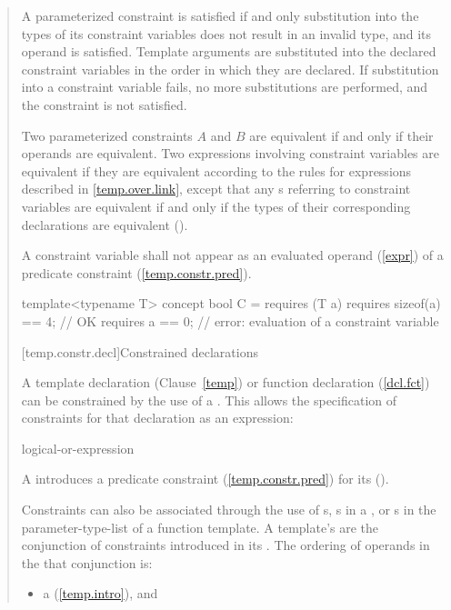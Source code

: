 \begin{quote}
\pnum
A parameterized constraint is satisfied if and only substitution into 
the types of its constraint variables does not result in an invalid type, and its
operand is satisfied. Template arguments are substituted into the declared
constraint variables in the order in which they are declared. If substitution 
into a constraint variable fails, no more substitutions are performed, and
the constraint is not satisfied.

\pnum
Two parameterized constraints $A$ and $B$ are equivalent 
if and only if their operands are equivalent.
% 
Two expressions involving constraint variables are equivalent if they
are equivalent according to the rules for expressions described in 
\ref{temp.over.link}, except that any s referring to 
constraint variables are equivalent if and only if the types of their 
corresponding declarations are equivalent ().

\pnum
A constraint variable shall not appear as an evaluated operand 
(\ref{expr}) of a predicate constraint (\ref{temp.constr.pred}).
\enterexample
\begin{codeblock}
template<typename T> 
  concept bool C = requires (T a) {
    requires sizeof(a) == 4; // OK
    requires a == 0;         // error: evaluation of a constraint variable
  }
\end{codeblock}
\exitexample


[temp.constr.decl]{Constrained declarations}

\pnum
A template declaration (Clause~\ref{temp}) or function declaration 
(\ref{dcl.fct}) can be constrained by the use of a 
. 
% 
This allows the specification of constraints for that declaration as
an expression:

\begin{bnf}
\br
    logical-or-expression
\end{bnf}

A  introduces a predicate constraint
(\ref{temp.constr.pred}) for its 
().

\pnum
Constraints can also be associated through the use of 
s, 
s in a 
, or 
s in the parameter-type-list
of a function template.
% 
A template's  are the conjunction of 
constraints introduced in its . 
% 
The ordering of operands in the that conjunction is:
% 
\begin{itemize}
\item a  (\ref{temp.intro}), and


\end{itemize}
\end{quote}
